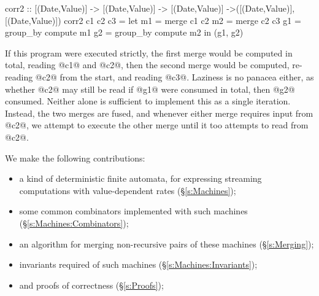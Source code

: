\begin{code}
corr2     :: [(Date,Value)] -> [(Date,Value)]
          -> [(Date,Value)]
          ->([(Date,Value)],   [(Date,Value)])
corr2     c1 c2 c3
 = let m1 = merge c1 c2
       m2 = merge c2 c3
       g1 = group_by compute m1
       g2 = group_by compute m2
   in (g1, g2)
\end{code}

If this program were executed strictly, the first merge would be computed in total, reading @c1@ and @c2@, then the second merge would be computed, re-reading @c2@ from the start, and reading @c3@.
Laziness is no panacea either, as whether @c2@ may still be read if @g1@ were consumed in total, then @g2@ consumed.
Neither alone is sufficient to implement this as a single iteration.
Instead, the two merges are fused, and whenever either merge requires input from @c2@, we attempt to execute the other merge until it too attempts to read from @c2@.

We make the following contributions:
\begin{itemize}
\item a kind of deterministic finite automata, for expressing streaming computations with value-dependent rates (\S\ref{s:Machines});
\item some common combinators implemented with such machines (\S\ref{s:Machines:Combinators});
\item an algorithm for merging non-recursive pairs of these machines (\S\ref{s:Merging});
\item invariants required of such machines (\S\ref{s:Machines:Invariants});
\item and proofs of correctness (\S\ref{s:Proofs});
\end{itemize}


\newpage

